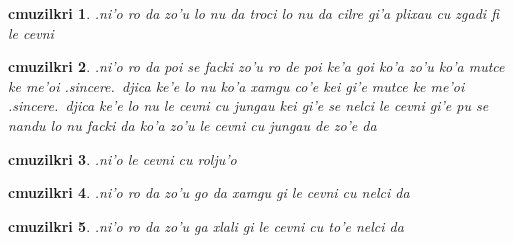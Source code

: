\documentclass{report}
\newtheorem{cmuzilkri}{cmuzilkri}
\begin{document}
\begin{cmuzilkri}
	.ni'o ro da zo'u lo nu da troci lo nu da cilre gi'a plixau cu zgadi fi le cevni
\end{cmuzilkri}
\begin{cmuzilkri}
	.ni'o ro da poi se facki zo'u ro de poi ke'a goi ko'a zo'u ko'a mutce ke me'oi .sincere.\ djica ke'e lo nu ko'a xamgu co'e kei gi'e mutce ke me'oi .sincere.\ djica ke'e lo nu le cevni cu jungau kei gi'e se nelci le cevni gi'e pu se nandu lo nu facki da ko'a zo'u le cevni cu jungau de zo'e da
\end{cmuzilkri}
\begin{cmuzilkri}
	.ni'o le cevni cu rolju'o
\end{cmuzilkri}
\begin{cmuzilkri}
	.ni'o ro da zo'u go da xamgu gi le cevni cu nelci da
\end{cmuzilkri}
\begin{cmuzilkri}
	.ni'o ro da zo'u ga xlali gi le cevni cu to'e nelci da
\end{cmuzilkri}
\end{document}
